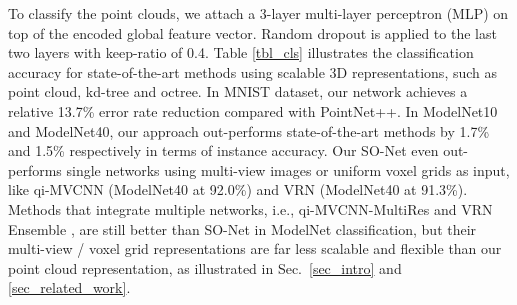 \documentclass[10pt,twocolumn,letterpaper]{article}
\begin{document}
To classify the point clouds, we attach a 3-layer multi-layer perceptron (MLP) on top of the encoded global feature vector. Random dropout is applied to the last two layers with keep-ratio of 0.4. Table \ref{tbl_cls} illustrates the classification accuracy for state-of-the-art methods using scalable 3D representations, such as point cloud, kd-tree and octree. In MNIST dataset, our network achieves a relative 13.7\% error rate reduction compared with PointNet++. In ModelNet10 and ModelNet40, our approach out-performs state-of-the-art methods by 1.7\% and 1.5\% respectively in terms of instance accuracy. Our SO-Net even out-performs single networks using multi-view images or uniform voxel grids as input, like qi-MVCNN \cite{qi2016volumetric} (ModelNet40 at 92.0\%) and VRN \cite{brock2016generative} (ModelNet40 at 91.3\%). Methods that integrate multiple networks, i.e., qi-MVCNN-MultiRes \cite{qi2016volumetric} and VRN Ensemble \cite{brock2016generative}, are still better than SO-Net in ModelNet classification, but their multi-view / voxel grid representations are far less scalable and flexible than our point cloud representation, as illustrated in Sec.~\ref{sec_intro} and \ref{sec_related_work}. 

\end{document}
